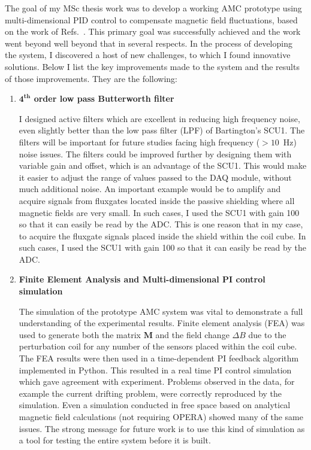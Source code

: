 The goal of my MSc thesis work was to develop a working AMC prototype using multi-dimensional PID control to compensate magnetic field 
fluctuations, based on the work of Refs.~\cite{bea,lins}. This primary goal was successfully achieved and the work went beyond well beyond that in several respects. In the process of developing the system, I discovered a host of new challenges, to which I found innovative solutions.  Below I
list the key improvements made to the system and the results of those
improvements.  They are the following:
\begin{enumerate}
\item {\bf $\mathbf{4^{th}}$ order low pass Butterworth filter}  

I designed active filters which are excellent in reducing high frequency noise, even slightly better than the low pass filter (LPF) of Bartington's SCU1. The filters will be important for future studies facing high frequency ($>10$~Hz) noise issues. The filters could be improved further by designing them with variable gain and offset, which is an advantage of the SCU1. This would make it easier to adjust the range of values passed to the DAQ module, without much additional noise. An important example would be to amplify and acquire signals from fluxgates located inside the passive shielding where all magnetic fields are very small. In such cases, I used the SCU1 with gain 100 so that it can easily be read by the ADC.
This is one reason that in my case, to acquire the fluxgate signals placed inside the shield within the coil cube. In such cases, I used the SCU1 with gain 100 so that it can easily be read by the ADC.  



\item {\bf Finite Element Analysis and Multi-dimensional PI control simulation}  

The simulation of the prototype AMC system was vital to demonstrate a full understanding of the experimental results. Finite element analysis (FEA) was used to generate both the matrix $\bm{M}$ and the field change $\Delta B$ due to the perturbation coil for any number of the sensors placed within the coil cube. The FEA results were then used in a time-dependent PI feedback algorithm implemented in Python. This resulted in a real time PI control simulation which gave agreement with experiment. Problems observed in the data, for example the current drifting problem, were correctly reproduced by the simulation. Even a simulation conducted in free space based on analytical magnetic field calculations (not requiring OPERA) showed many of the same issues. The strong message for future work is to use this kind of simulation as a tool for testing the entire system before it is built.


\end{enumerate}
